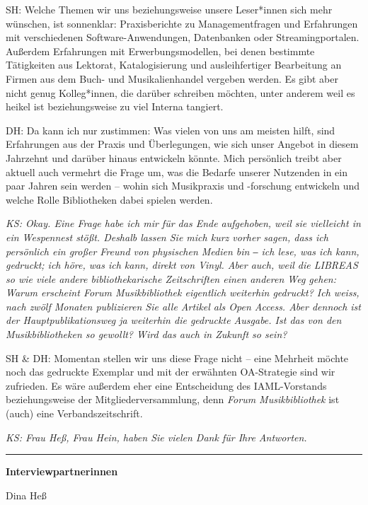 \documentclass[a4paper,
fontsize=11pt,
oneside,
numbers=noperiodatend,
parskip=half-,
bibliography=totoc,
final
]{scrartcl}
\begin{document}
SH: Welche Themen wir uns beziehungsweise unsere Leser*innen sich mehr
wünschen, ist sonnenklar: Praxisberichte zu Managementfragen und
Erfahrungen mit verschiedenen Software-Anwendungen, Datenbanken oder
Streamingportalen. Außerdem Erfahrungen mit Erwerbungsmodellen, bei
denen bestimmte Tätigkeiten aus Lektorat, Katalogisierung und
ausleihfertiger Bearbeitung an Firmen aus dem Buch- und Musikalienhandel
vergeben werden. Es gibt aber nicht genug Kolleg*innen, die darüber
schreiben möchten, unter anderem weil es heikel ist beziehungsweise zu
viel Interna tangiert.

DH: Da kann ich nur zustimmen: Was vielen von uns am meisten hilft, sind
Erfahrungen aus der Praxis und Überlegungen, wie sich unser Angebot in
diesem Jahrzehnt und darüber hinaus entwickeln könnte. Mich persönlich
treibt aber aktuell auch vermehrt die Frage um, was die Bedarfe unserer
Nutzenden in ein paar Jahren sein werden -- wohin sich Musikpraxis und
-forschung entwickeln und welche Rolle Bibliotheken dabei spielen
werden.

\emph{KS: Okay. Eine Frage habe ich mir für das Ende aufgehoben, weil
sie vielleicht in ein Wespennest stößt. Deshalb lassen Sie mich kurz
vorher sagen, dass ich persönlich ein großer Freund von physischen
Medien bin ‒ ich lese, was ich kann, gedruckt; ich höre, was ich kann,
direkt von Vinyl. Aber auch, weil die LIBREAS so wie viele andere
bibliothekarische Zeitschriften einen anderen Weg gehen: Warum erscheint
Forum Musikbibliothek eigentlich weiterhin gedruckt? Ich weiss, nach
zwölf Monaten publizieren Sie alle Artikel als Open Access. Aber dennoch
ist der Hauptpublikationsweg ja weiterhin die gedruckte Ausgabe. Ist das
von den Musikbibliotheken so gewollt? Wird das auch in Zukunft so sein?}

SH \& DH: Momentan stellen wir uns diese Frage nicht -- eine Mehrheit
möchte noch das gedruckte Exemplar und mit der erwähnten OA-Strategie
sind wir zufrieden. Es wäre außerdem eher eine Entscheidung des
IAML-Vorstands beziehungsweise der Mitgliederversammlung, denn
\emph{Forum Musikbibliothek} ist (auch) eine Verbandszeitschrift.

\emph{KS: Frau Heß, Frau Hein, haben Sie vielen Dank für Ihre
Antworten.}

\begin{center}\rule{0.5\linewidth}{0.5pt}\end{center}

\textbf{Interviewpartnerinnen}

Dina Heß
\end{document}

